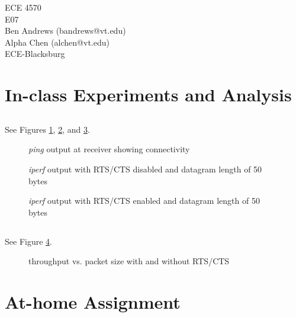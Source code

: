 \documentclass[11pt]{article}
\begin{document}
\begin{flushright}
{ECE 4570}\\{E07}\\{Ben Andrews (bandrews@vt.edu)}\\{Alpha Chen (alchen@vt.edu)}\\{ECE-Blacksburg}\end{flushright}

\section{In-class Experiments and Analysis}

\subsection{}

See Figures \ref{ping}, \ref{no_rts}, and \ref{rts}.

\begin{figure}[hp]
	\caption{\emph{ping} output at receiver showing connectivity}
	\label{ping}
\end{figure}

\begin{figure}[hp]
	\caption{\emph{iperf} output with RTS/CTS disabled and datagram length of 50 bytes}
	\label{no_rts}
\end{figure}

\begin{figure}[hp]
	\caption{\emph{iperf} output with RTS/CTS enabled and datagram length of 50 bytes}
	\label{rts}
\end{figure}

\subsection{}

See Figure \ref{graph}.

\begin{figure}[hp]
	\caption{throughput vs. packet size with and without RTS/CTS}
	\label{graph}
\end{figure}

\section{At-home Assignment}

\subsection{}
\end{document}
